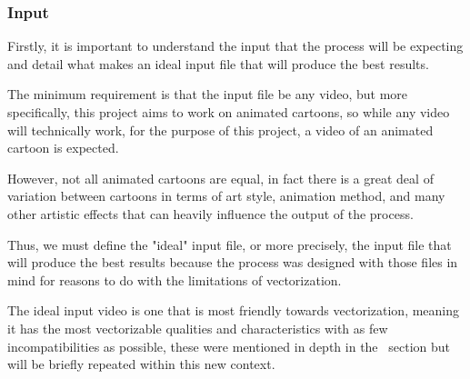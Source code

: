 \documentclass[12pt]{article}
\newcommand{\sentence}{} %
\begin{document}
    \subsubsection{Input}\label{subsubsec:input}

    \tab
    Firstly, it is important to understand the input that the process will be expecting and detail what makes an ideal
    input file that will produce the best results.
    \sentence
    The minimum requirement is that the input file be any video, but more specifically, this project
    aims to work on animated cartoons, so while any video will technically work, for the purpose of this project, a
    video of an animated cartoon is expected.
    \sentence
    However, not all animated cartoons are equal, in fact there is a great deal of variation between cartoons in
    terms of art style, animation method, and many other artistic effects that can heavily influence the output of
    the process.
    \sentence
    Thus, we must define the "ideal" input file, or more precisely, the input file that will produce the best results
    because the process was designed with those files in mind for reasons to do with the limitations of vectorization.
    \sentence
    The ideal input video is one that is most friendly towards vectorization, meaning it has the most vectorizable
    qualities and characteristics with as few incompatibilities as possible, these were mentioned in depth
    in the~ section but will be briefly repeated within this new context.
\end{document}
